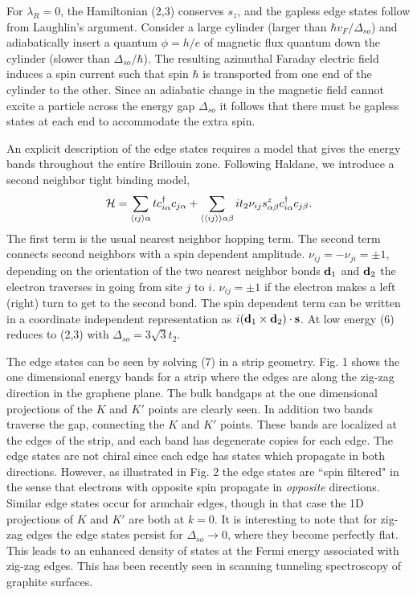 \documentclass[twocolumn,showpacs,floatfix,prl]{revtex4}
\begin{document}
For $\lambda_R=0$, the Hamiltonian (2,3) conserves
$s_z$, and the gapless edge states follow from
Laughlin's argument\cite{laughlin}.
Consider a large cylinder
(larger than $\hbar v_F/\Delta_{so}$) and adiabatically insert a quantum
$\phi = h/e$ of magnetic flux quantum down the cylinder (slower than $\Delta_{so}/\hbar$).
The resulting azimuthal Faraday
electric field induces a spin current such that spin $\hbar$ is
transported from one end of the cylinder to the other.  Since an
adiabatic change in the magnetic field cannot excite a particle
across the energy gap $\Delta_{so}$ it follows that there must be gapless
states at each end to accommodate the extra spin.

An explicit description of the edge states requires a model that
gives the energy bands throughout the entire Brillouin zone.
Following Haldane\cite{haldane1}, we introduce a second neighbor tight
binding model,
\begin{equation}
{\cal H} =  \sum_{\langle ij\rangle \alpha}  t c_{i\alpha}^\dagger c_{j\alpha}
+ \sum_{\langle\langle ij \rangle\rangle \alpha\beta} i t_2
\nu_{ij}s^z_{\alpha\beta}  c_{i\alpha}^\dagger
c_{j\beta}.
\end{equation}
The first term is the usual nearest neighbor hopping term.  The
second term connects second neighbors with a spin dependent
amplitude.  $\nu_{ij}=-\nu_{ji} = \pm 1$, depending on the
orientation of the two nearest neighbor bonds ${\bf d}_1$ and ${\bf d}_2$
the electron traverses in going from site $j$ to $i$.  $\nu_{ij}=\pm 1$
if the electron makes a left (right) turn to get to the second bond.
The spin dependent term can be written in a coordinate
independent representation as
 $i( {\bf d}_1\times {\bf d}_2) \cdot{\bf s}$.
At low energy (6)
reduces to (2,3) with $\Delta_{so} = 3\sqrt{3} t_2$.

The edge states can be seen by solving
(7) in a strip geometry.  Fig. 1 shows the
one dimensional energy bands for a strip where the edges are
along the zig-zag direction in the graphene plane.  The bulk
bandgaps at the one dimensional projections of the $K$ and $K'$
points are clearly seen. In addition two
bands traverse the gap, connecting the $K$ and $K'$ points.
These bands are localized at the edges of the strip, and each
band has degenerate copies for each edge.  The edge states are
not chiral since each edge has states which propagate in both
directions.  However, as illustrated in
Fig. 2 the edge states are ``spin filtered" in the sense that
electrons with opposite spin propagate in {\it opposite} directions.
Similar edge states occur for
armchair edges, though in that case the 1D projections of $K$ and
$K'$ are both at $k=0$.
It is interesting to note that for zig-zag edges the edge states persist
for $\Delta_{so}\rightarrow 0$, where they become perfectly
flat\cite{zigzagedge}.  This leads to an enhanced density of states at the Fermi
energy associated with zig-zag edges.  This has
been recently seen in scanning tunneling spectroscopy of graphite
surfaces\cite{stsexpt}.
\end{document}

